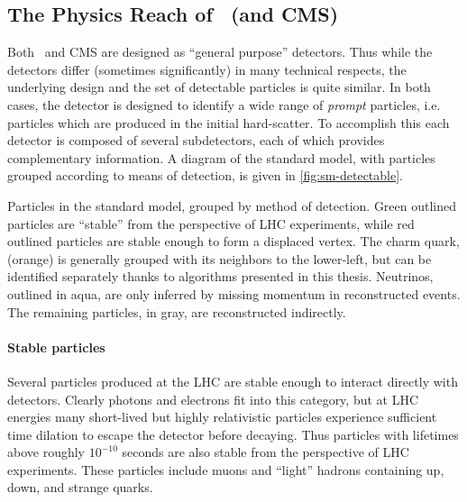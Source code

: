 
\subsection{The Physics Reach of \atlas\ (and CMS)}
Both \atlas\ and CMS are designed as ``general purpose'' detectors.
Thus while the detectors differ (sometimes significantly) in many technical respects, the underlying design and the set of detectable particles is quite similar.
In both cases, the detector is designed to identify a wide range of \emph{prompt} particles, i.e. particles which are produced in the initial hard-scatter.
To accomplish this each detector is composed of several subdetectors, each of which provides complementary information.
A diagram of the standard model, with particles grouped according to means of detection, is given in \cref{fig:sm-detectable}.

\begin{cfig}
  \caption[Particles in the standard model grouped by detection method]{
    Particles in the standard model, grouped by method of detection.
    Green outlined particles are ``stable'' from the perspective of LHC experiments, while red outlined particles are stable enough to form a displaced vertex.
    The charm quark, (orange) is generally grouped with its neighbors to the lower-left, but can be identified separately thanks to algorithms presented in this thesis.
    Neutrinos, outlined in aqua, are only inferred by missing momentum in reconstructed events.
    The remaining particles, in gray, are reconstructed indirectly.
  }
  \label{fig:sm-detectable}
\end{cfig}

\paragraph{Stable particles} Several particles produced at the LHC are stable enough to interact directly with detectors.
Clearly photons and electrons fit into this category, but at LHC energies many short-lived but highly relativistic particles experience sufficient time dilation to escape the detector before decaying.
Thus particles with lifetimes above roughly $10^{-10}$ seconds are also stable from the perspective of LHC experiments.
These particles include muons and ``light'' hadrons containing up, down, and strange quarks.

